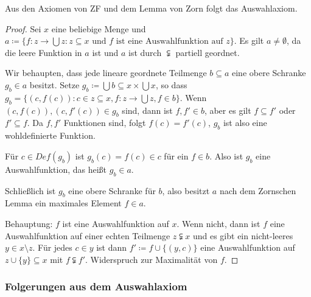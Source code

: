 \begin{satz}
	Aus den Axiomen von ZF und dem Lemma von Zorn folgt das Auswahlaxiom.
\end{satz}
\begin{proof}
	Sei $x$ eine beliebige Menge und $a\coloneqq\{f:z\to\bigcup z : z\subseteq x \text{ und } f \text{ ist eine Auswahlfunktion auf } z\}$.
	Es gilt $a\neq\emptyset$, da die leere Funktion in $a$ ist und $a$ ist durch $\subsetneqq$ partiell geordnet.
	
	Wir behaupten, dass jede lineare geordnete Teilmenge $b\subseteq a$ eine obere Schranke $g_b\in a$ besitzt. Setze $g_b\coloneqq \bigcup b\subseteq x\times \bigcup x$, so dass $g_b=\{(c, f(c)) : c\in z\subseteq x, f:z\to\bigcup z, f\in b\}$. Wenn $(c,f(c)),(c,f'(c))\in g_b$ sind, dann ist $f, f'\in b$, aber es gilt $f\subseteq f'$ oder $f'\subseteq f$. Da $f,f'$ Funktionen sind, folgt $f(c)=f'(c)$, $g_b$ ist also eine wohldefinierte Funktion.
	
	Für $c\in Def(g_b)$ ist $g_b(c)=f(c)\in c$ für ein $f\in b$. Also ist $g_b$ eine Auswahlfunktion, das heißt $g_b\in a$.
	
	Schließlich ist $g_b$ eine obere Schranke für $b$, also besitzt $a$ nach dem Zornschen Lemma ein maximales Element $f\in a$.
	
	Behauptung: $f$ ist eine Auswahlfunktion auf $x$. Wenn nicht, dann ist $f$ eine Auswahlfunktion auf einer echten Teilmenge $z\subsetneqq x$ und es gibt ein nicht-leeres $y\in x\setminus z$. Für jedes $c\in y$ ist dann $f'\coloneqq f\cup\{(y,c)\}$ eine Auswahlfunktion auf $z\cup\{y\}\subseteq x$ mit $f\subsetneqq f'$. Widerspruch zur Maximalität von $f$.
\end{proof}

\subsubsection{Folgerungen aus dem Auswahlaxiom}

